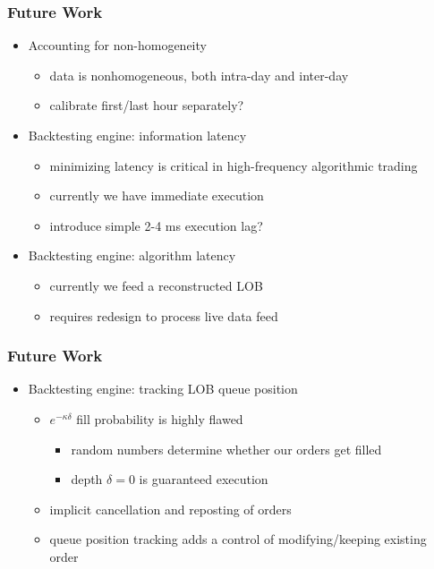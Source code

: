\begin{frame}
\frametitle{Future Work}
\begin{itemize}
\item Accounting for non-homogeneity
\begin{itemize}
\item data is nonhomogeneous, both intra-day and inter-day
\item calibrate first/last hour separately?
\end{itemize}
\item Backtesting engine: information latency
\begin{itemize}
\item minimizing latency is critical in high-frequency algorithmic trading
\item currently we have immediate execution
\item introduce simple 2-4 ms execution lag?
\end{itemize}
\item Backtesting engine: algorithm latency
\begin{itemize}
\item currently we feed a reconstructed LOB
\item requires redesign to process live data feed
\end{itemize}
\end{itemize}
\end{frame}

\begin{frame}
\frametitle{Future Work}
\begin{itemize}
\item Backtesting engine: tracking LOB queue position
\begin{itemize}
\item $e^{-\kappa \delta}$ fill probability is highly flawed
\begin{itemize}
\item random numbers determine whether our orders get filled
\item depth $\delta=0$ is guaranteed execution
\end{itemize}
\item implicit cancellation and reposting of orders
\item queue position tracking adds a control of modifying/keeping existing order
\end{itemize}
\end{itemize}
\end{frame}